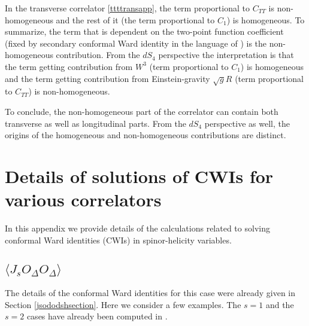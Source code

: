 \documentclass[a4paper,11pt]{article}
\begin{document}
In the transverse correlator \eqref{ttttransapp}, the term proportional to $C_{TT}$ is non-homogeneous and the rest of it (the term proportional to $C_1$) is homogeneous.  To summarize, the term that is dependent on the two-point function coefficient (fixed by secondary conformal Ward identity in the language of \cite{Bzowski:2013sza}) is the non-homogeneous contribution. From the $dS_4$ perspective the interpretation is  that the term getting contribution from $W^3$ (term proportional to $C_1$) is homogeneous and the term getting contribution from Einstein-gravity $\sqrt{g} R$ (term proportional to $C_{TT}$) is non-homogeneous.


To conclude, the non-homogeneous part of the correlator can contain both transverse as well as longitudinal parts. From the $dS_4$ perspective as well, the origins of the homogeneous and non-homogeneous contributions are distinct.




\section{Details of solutions of CWIs for various correlators}\label{CWI}
In this appendix we provide  details of the calculations related to solving conformal Ward identities (CWIs) in spinor-helicity variables. 

\subsection{$\langle J_s O_{\Delta}O_{\Delta} \rangle$}
The details of the conformal Ward identities for this case were already given in Section \ref{jsododshsection}. Here we consider a few examples. The $s=1$ and the $s=2$ cases have already been computed in \cite{Bzowski:2013sza}. 
\end{document}
